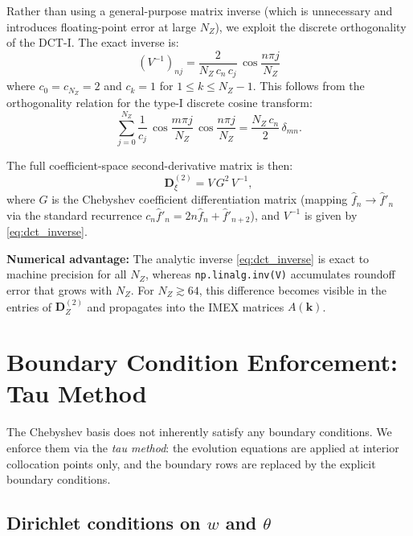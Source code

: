 \documentclass[11pt]{article}
\newcommand{\Dvec}{\bm{D}}
\begin{document}
Rather than using a general-purpose matrix inverse (which is unnecessary and introduces floating-point error at large $N_Z$), we exploit the discrete orthogonality of the DCT-I. The exact inverse is:
\begin{equation}
\boxed{
(V^{-1})_{nj} = \frac{2}{N_Z\,c_n\,c_j}\,\cos\!\frac{n\pi j}{N_Z}
}
\label{eq:dct_inverse}
\end{equation}
where $c_0 = c_{N_Z} = 2$ and $c_k = 1$ for $1 \le k \le N_Z - 1$. This follows from the orthogonality relation for the type-I discrete cosine transform:
\begin{equation}
\sum_{j=0}^{N_Z} \frac{1}{c_j}\,\cos\!\frac{m\pi j}{N_Z}\,\cos\!\frac{n\pi j}{N_Z} = \frac{N_Z\,c_n}{2}\,\delta_{mn}.
\end{equation}

The full coefficient-space second-derivative matrix is then:
\begin{equation}
\Dvec_\xi^{(2)} = V\,G^2\,V^{-1},
\end{equation}
where $G$ is the Chebyshev coefficient differentiation matrix (mapping $\hat{f}_n \to \hat{f}'_n$ via the standard recurrence $c_n \hat{f}'_n = 2n\hat{f}_n + \hat{f}'_{n+2}$), and $V^{-1}$ is given by \eqref{eq:dct_inverse}.

\textbf{Numerical advantage:} The analytic inverse \eqref{eq:dct_inverse} is exact to machine precision for all $N_Z$, whereas \texttt{np.linalg.inv(V)} accumulates roundoff error that grows with $N_Z$. For $N_Z \gtrsim 64$, this difference becomes visible in the entries of $\Dvec_Z^{(2)}$ and propagates into the IMEX matrices $A(\bm{k})$.


\section{Boundary Condition Enforcement: Tau Method}
\label{sec:tau}

The Chebyshev basis does not inherently satisfy any boundary conditions. We enforce them via the \emph{tau method}: the evolution equations are applied at interior collocation points only, and the boundary rows are replaced by the explicit boundary conditions.

\subsection{Dirichlet conditions on $w$ and $\theta$}
\end{document}
